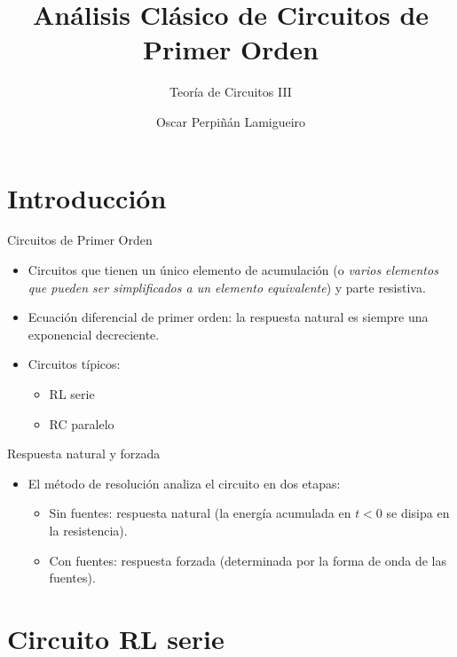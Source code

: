 \documentclass[aspectratio=169, usenames,svgnames,dvipsnames]{beamer}
\author{Oscar Perpiñán Lamigueiro}
\date{}
\title{Análisis Clásico de Circuitos de Primer Orden}
\subtitle{Teoría de Circuitos III}
\begin{document}
\maketitle

\section{Introducción}
\label{sec:orgc18bc8d}

\begin{frame}[label={sec:org4a2dd9b}]{Circuitos de Primer Orden}
\begin{itemize}
\item Circuitos que tienen un \alert{único elemento de acumulación} (o \emph{varios elementos que pueden ser simplificados a un elemento equivalente}) y parte resistiva.
\item \alert{Ecuación diferencial de primer orden}: la respuesta natural es siempre una \alert{exponencial decreciente}.
\item Circuitos típicos:
\begin{itemize}
\item RL serie
\item RC paralelo
\end{itemize}
\end{itemize}
\end{frame}
\begin{frame}[label={sec:orga41d373}]{Respuesta natural y forzada}
\begin{itemize}
\item El método de resolución analiza el circuito en dos etapas:
\begin{itemize}
\item Sin fuentes: \alert{respuesta natural} (la energía acumulada en \(t < 0\) se disipa en la resistencia).
\item Con fuentes: \alert{respuesta forzada} (determinada por la forma de onda de las fuentes).
\end{itemize}
\end{itemize}
\end{frame}

\section{Circuito RL serie}
\label{sec:org3b94a1a}
\end{document}
